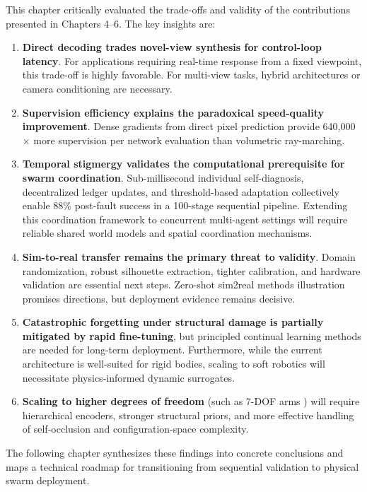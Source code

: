 \documentclass[12pt,a4paper,oneside]{report}
\begin{document}
This chapter critically evaluated the trade-offs and validity of the contributions presented in Chapters 4--6. The key insights are:
\begin{enumerate}
    \item \textbf{Direct decoding trades novel-view synthesis for control-loop latency}. For applications requiring real-time response from a fixed viewpoint, this trade-off is highly favorable. For multi-view tasks, hybrid architectures or camera conditioning are necessary.
    \item \textbf{Supervision efficiency explains the paradoxical speed-quality improvement}. Dense gradients from direct pixel prediction provide 640,000$\times$ more supervision per network evaluation than volumetric ray-marching.
    \item \textbf{Temporal stigmergy validates the computational prerequisite for swarm coordination}. Sub-millisecond individual self-diagnosis, decentralized ledger updates, and threshold-based adaptation collectively enable 88\% post-fault success in a 100-stage sequential pipeline. Extending this coordination framework to concurrent multi-agent settings will require reliable shared world models and spatial coordination mechanisms.
    \item \textbf{Sim-to-real transfer remains the primary threat to validity}. Domain randomization, robust silhouette extraction, tighter calibration, and hardware validation are essential next steps. Zero-shot sim2real methods illustration promises directions, but deployment evidence remains decisive.
    \item \textbf{Catastrophic forgetting under structural damage is partially mitigated by rapid fine-tuning}, but principled continual learning methods are needed for long-term deployment. Furthermore, while the current architecture is well-suited for rigid bodies, scaling to soft robotics will necessitate physics-informed dynamic surrogates.
    \item \textbf{Scaling to higher degrees of freedom} (such as 7-DOF arms \cite{schulze2024high}) will require hierarchical encoders, stronger structural priors, and more effective handling of self-occlusion and configuration-space complexity.
\end{enumerate}

The following chapter synthesizes these findings into concrete conclusions and maps a technical roadmap for transitioning from sequential validation to physical swarm deployment.
\clearpage
\end{document}
